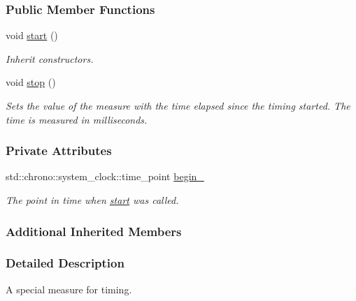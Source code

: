\subsubsection*{Public Member Functions}
\begin{DoxyCompactItemize}
\item 
void \hyperlink{structslb_1_1core_1_1util_1_1Timer_a9a219fbf1709161e09f04adcdf67efc4}{start} ()
\begin{DoxyCompactList}\small\item\em Inherit constructors. \end{DoxyCompactList}\item 
void \hyperlink{structslb_1_1core_1_1util_1_1Timer_a8f807b89df47fdcd80163d4f4ea9f0f1}{stop} ()\hypertarget{structslb_1_1core_1_1util_1_1Timer_a8f807b89df47fdcd80163d4f4ea9f0f1}{}\label{structslb_1_1core_1_1util_1_1Timer_a8f807b89df47fdcd80163d4f4ea9f0f1}

\begin{DoxyCompactList}\small\item\em Sets the value of the measure with the time elapsed since the timing started. The time is measured in milliseconds. \end{DoxyCompactList}\end{DoxyCompactItemize}
\subsubsection*{Private Attributes}
\begin{DoxyCompactItemize}
\item 
std\+::chrono\+::system\+\_\+clock\+::time\+\_\+point \hyperlink{structslb_1_1core_1_1util_1_1Timer_adc272d07c8d322a998a878312f4690b7}{begin\+\_\+}\hypertarget{structslb_1_1core_1_1util_1_1Timer_adc272d07c8d322a998a878312f4690b7}{}\label{structslb_1_1core_1_1util_1_1Timer_adc272d07c8d322a998a878312f4690b7}

\begin{DoxyCompactList}\small\item\em The point in time when \hyperlink{structslb_1_1core_1_1util_1_1Timer_a9a219fbf1709161e09f04adcdf67efc4}{start} was called. \end{DoxyCompactList}\end{DoxyCompactItemize}
\subsubsection*{Additional Inherited Members}


\subsubsection{Detailed Description}
A special measure for timing. 

